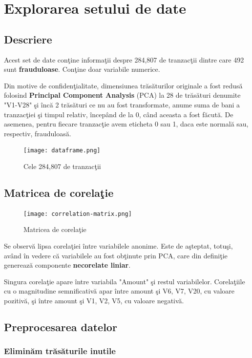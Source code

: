 \chapter{Explorarea setului de date}

\section{Descriere}

Acest set de date conţine informaţii despre 284,807 de tranzacţii dintre care 
492 sunt \textbf{frauduloase}. Conţine doar variabile numerice.

Din motive de confidenţialitate, dimensiunea trăsăturilor originale a fost 
redusă folosind \textbf{Principal Component Analysis} (PCA) la 28 de trăsături denumite 
"V1-V28" şi încă 2 trăsături ce nu au fost transformate, anume suma de bani
a tranzacţiei şi timpul relativ, începând de la 0, când aceasta a fost făcută. 
De asemenea, pentru fiecare tranzacţie avem eticheta 0 sau 1, daca este normală 
sau, respectiv, frauduloasă.

\begin{figure}[H]
    \texttt{[image: dataframe.png]}
    \caption{Cele 284,807 de tranzacţii}
\end{figure}


\section{Matricea de corelaţie}

\begin{figure}[H]
    \texttt{[image: correlation-matrix.png]}
    \caption{Matricea de corelaţie}
\end{figure}

Se observă lipsa corelaţiei între variabilele anonime. Este de aşteptat, totuşi, 
având în vedere că variabilele au fost obţinute prin PCA, care din definiţie generează 
componente \textbf{necorelate liniar}.

Singura corelaţie apare între variabila "Amount" şi restul variabilelor. Corelaţiile
cu o magnitudine semnificativă apar între amount şi V6, V7, V20, cu valoare pozitivă, 
şi între amount şi V1, V2, V5, cu valoare negativă.

\section{Preprocesarea datelor}

\subsection{Eliminăm trăsăturile inutile}

